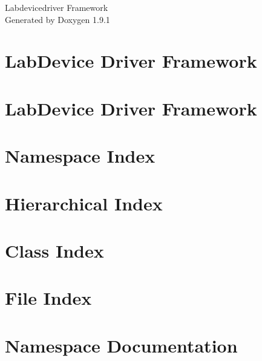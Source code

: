 \let\mypdfximage\pdfximage\def\pdfximage{\immediate\mypdfximage}\documentclass[twoside]{book}
\newcommand{\+}{\discretionary{\mbox{\scriptsize$\hookleftarrow$}}{}{}}
\newcommand{\clearemptydoublepage}{%
  \newpage{\pagestyle{empty}\cleardoublepage}%
}
\begin{document}
\raggedbottom

\hypersetup{pageanchor=false,
             bookmarksnumbered=true,
             pdfencoding=unicode
            }
\begin{titlepage}
\vspace*{7cm}
\begin{center}%
{\Large Labdevicedriver Framework }\\
\vspace*{1cm}
{\large Generated by Doxygen 1.9.1}\\
\end{center}
\end{titlepage}
\clearemptydoublepage
{}
\tableofcontents
\clearemptydoublepage
{}
\hypersetup{pageanchor=true}

\chapter{Lab\+Device Driver Framework}
\label{index}\hypertarget{index}{}
\chapter{Lab\+Device Driver Framework}
\label{md__home_thomas__h_f__lab_gitlab_labdevice__r_e_a_d_m_e}

\chapter{Namespace Index}

\chapter{Hierarchical Index}

\chapter{Class Index}

\chapter{File Index}

\chapter{Namespace Documentation}




\end{document}
